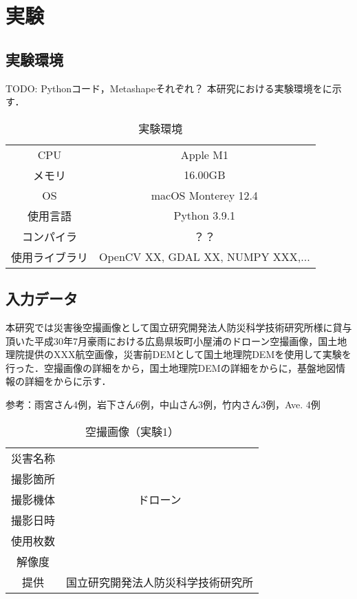 \chapter{実験}
  \section{実験環境}
  TODO: Pythonコード，Metashapeそれぞれ？
    本研究における実験環境をに示す．

    \begin{table}[b]
      \centering
      \caption{実験環境}
      \label{実験環境}
      \begin{tabular}{cc}
        \hline
        CPU & Apple M1 \\
        メモリ & 16.00GB \\
        OS & macOS Monterey 12.4 \\
        使用言語 & Python 3.9.1 \\
        コンパイラ & ？？ \\
        使用ライブラリ & OpenCV XX, GDAL XX, NUMPY XXX,... \\ \hline
      \end{tabular}
    \end{table}


  \section{入力データ}
    本研究では災害後空撮画像として国立研究開発法人防災科学技術研究所様に貸与頂いた平成30年7月豪雨における広島県坂町小屋浦のドローン空撮画像\cite{}，国土地理院提供のXXX航空画像，災害前DEMとして国土地理院DEMを使用して実験を行った．空撮画像の詳細をから，国土地理院DEMの詳細をからに，基盤地図情報の詳細をからに示す．

    参考：雨宮さん4例，岩下さん6例，中山さん3例，竹内さん3例，Ave. 4例

    \begin{table}[b]
      \centering
      \caption{空撮画像（実験1）}
      \label{空撮画像1}
      \begin{tabular}{cc}
        \hline
        災害名称 &  \\
        撮影箇所 &  \\
        撮影機体 & ドローン \\
        撮影日時 &  \\
        使用枚数 & \\
        解像度 &  \\
        提供 & 国立研究開発法人防災科学技術研究所 \\ \hline
      \end{tabular}
    \end{table}

